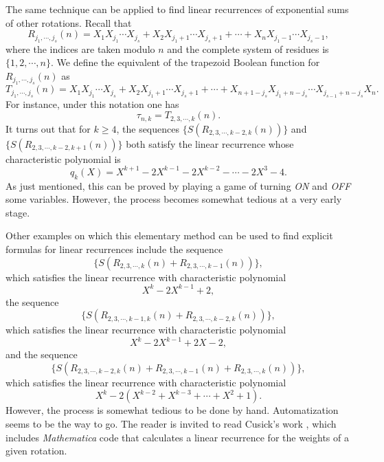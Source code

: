 
The same technique can be applied to find linear recurrences of exponential sums of other rotations.  Recall that 
\begin{equation}
R_{j_1,\cdots, j_s}(n)=X_1X_{j_1}\cdots X_{j_s}+X_2X_{j_1+1}\cdots X_{j_s+1}+\cdots+X_nX_{j_1-1}\cdots X_{j_s-1},
\end{equation}
where the indices are taken modulo $n$ and the complete system of residues is $\{1,2,\cdots, n\}$. 
We define the equivalent of the trapezoid Boolean function for $R_{j_1,\cdots, j_s}(n)$ as
\begin{equation}
T_{j_1,\cdots,j_s}(n)=X_1X_{j_1}\cdots X_{j_s}+X_2X_{j_1+1}\cdots X_{j_s+1}+\cdots+X_{n+1-j_s}X_{j_1+n-j_s}\cdots X_{j_{s-1}+n-j_s}X_n.
\end{equation}
For instance, under this notation one has
\begin{equation}
\tau_{n,k}=T_{2,3,\cdots, k}(n).
\end{equation}
It turns out that for $k\geq 4$, the sequences $\{S(R_{2,3,\cdots,k-2,k}(n))\}$ and $\{S(R_{2,3,\cdots,k-2,k+1}(n))\}$ both satisfy the linear recurrence whose characteristic polynomial is
\begin{equation}
q_k(X)=X^{k+1}-2X^{k-1}-2X^{k-2}-\cdots-2X^3-4.
\end{equation}
As just mentioned, this can be proved by playing a game of turning {\it ON} and {\it OFF} some variables.  However, the process becomes somewhat tedious at a very early stage.

Other examples on which this elementary method can be used to find explicit formulas for linear recurrences include the sequence
\begin{equation}
\{S(R_{2,3,\cdots,k}(n)+R_{2,3,\cdots,k-1}(n))\},
\end{equation}
which satisfies the linear recurrence with characteristic polynomial 
\begin{equation}
X^k-2X^{k-1}+2,
\end{equation}
the sequence
\begin{equation}
\{S(R_{2,3,\cdots, k-1,k}(n)+R_{2,3,\cdots,k-2,k}(n))\},
\end{equation}
which satisfies the linear recurrence with characteristic polynomial 
\begin{equation}
X^k-2X^{k-1}+2X-2,
\end{equation}
and the sequence 
\begin{equation}
\{S(R_{2, 3,\cdots, k-2,k}(n)+ R_{2, 3, \cdots, k-1}(n)+R_{2, 3, \cdots,k}(n))\},
\end{equation}
which satisfies the linear recurrence with characteristic polynomial 
\begin{equation}
X^k-2(X^{k-2}+X^{k-3}+\cdots+X^2+1).
\end{equation}
However, the process is somewhat tedious to be done by hand.  Automatization seems to be the way to go.  The reader is invited to read Cusick's work \cite{cusickArXiv}, which
includes {\em Mathematica} code that calculates a linear recurrence for the weights of a given rotation.

